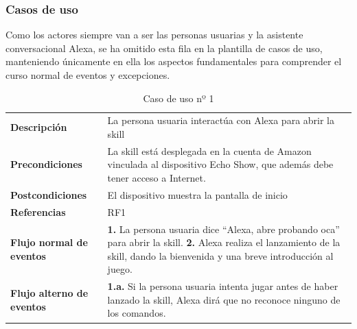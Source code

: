 \subsubsection{Casos de uso}

Como los actores siempre van a ser las personas usuarias y la asistente conversacional Alexa, se ha omitido esta fila en la plantilla de casos de uso, manteniendo únicamente en ella los aspectos fundamentales para comprender el curso normal de eventos y excepciones.

\begin{table}[H]
	\centering
	\begin{tabular}{|p{3cm}|p{12cm}|}
		\hline
		\rowcolor{lightgray}
		\multicolumn{2}{|c|}{\textbf{CU01}: Iniciar la skill} \\
		\hline
		\textbf{Descripción} & La persona usuaria interactúa con Alexa para abrir la skill \vspace{0.2cm} \\
		\hline
		\textbf{Precondiciones} & La skill está desplegada en la cuenta de Amazon vinculada al dispositivo Echo Show, que además debe tener acceso a Internet. \vspace{0.2cm} \\
		\hline
		\textbf{Postcondiciones} & El dispositivo muestra la pantalla de inicio \vspace{0.2cm} \\
		\hline
		\textbf{Referencias} & RF1 \vspace{0.2cm} \\
		\hline
		\textbf{Flujo normal de eventos} &
		\textbf{1.} La persona usuaria dice \enquote{Alexa, abre probando oca} para abrir la skill. \newline
		\vspace{0.2cm}
		\textbf{2.} Alexa realiza el lanzamiento de la skill, dando la bienvenida y una breve introducción al juego.
		\vspace{0.2cm} \\
		\hline
		\textbf{Flujo alterno de eventos} &
		\textbf{1.a.} Si la persona usuaria intenta jugar antes de haber lanzado la skill, Alexa dirá que no reconoce ninguno de los comandos. \vspace{0.2cm} \\
		\hline
	\end{tabular}
	\caption{Caso de uso nº 1}
	\label{tab:CU01}
\end{table}


